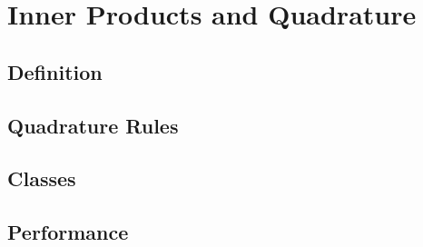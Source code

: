 \documentclass{article}
\begin{document}
\section{Inner Products and Quadrature}

\subsection{Definition}

\subsection{Quadrature Rules}

\subsection{Classes}

\subsection{Performance}
\end{document}
